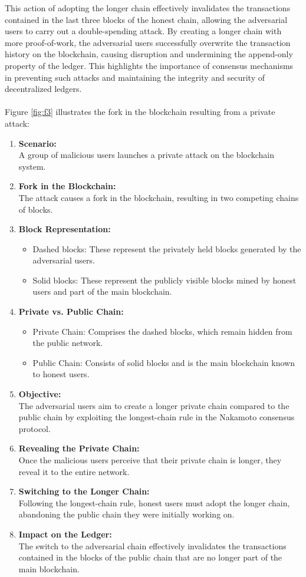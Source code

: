 This action of adopting the longer chain effectively invalidates the transactions contained in the last three blocks of the honest chain, allowing the adversarial users to carry out a double-spending attack. By creating a longer chain with more proof-of-work, the adversarial users successfully overwrite the transaction history on the blockchain, causing disruption and undermining the append-only property of the ledger. This highlights the importance of consensus mechanisms in preventing such attacks and maintaining the integrity and security of decentralized ledgers.\\\\
Figure \ref{fig:f3} illustrates the fork in the blockchain resulting from a private attack:
\begin{enumerate}
    \item \textbf{Scenario:} \\A group of malicious users launches a private attack on the blockchain system.
    \item \textbf{Fork in the Blockchain:} \\The attack causes a fork in the blockchain, resulting in two competing chains of blocks.
    \item \textbf{Block Representation:} 
    \begin{itemize}
        \item Dashed blocks: These represent the privately held blocks generated by the adversarial users.
        \item Solid blocks: These represent the publicly visible blocks mined by honest users and part of the main blockchain.
    \end{itemize}
    \item \textbf{Private vs. Public Chain:}
     \begin{itemize}
        \item Private Chain: Comprises the dashed blocks, which remain hidden from the public network.
        \item Public Chain: Consists of solid blocks and is the main blockchain known to honest users.
     \end{itemize}
    \item \textbf{Objective:} \\The adversarial users aim to create a longer private chain compared to the public chain by exploiting the longest-chain rule in the Nakamoto consensus protocol.
    \item \textbf{Revealing the Private Chain:}\\Once the malicious users perceive that their private chain is longer, they reveal it to the entire network.
    \item \textbf{Switching to the Longer Chain:} \\Following the longest-chain rule, honest users must adopt the longer chain, abandoning the public chain they were initially working on.
    \item \textbf{Impact on the Ledger:}\\The switch to the adversarial chain effectively invalidates the transactions contained in the blocks of the public chain that are no longer part of the main blockchain.
\end{enumerate}
